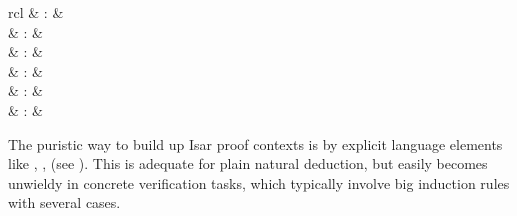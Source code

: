 \begin{isabellebody}
\begin{isamarkuptext}
\begin{description}
  \end{description}%
\end{isamarkuptext}%
\isamarkuptrue%
%
\isamarkuptrue%
%
\isamarkuptrue%
%
\begin{isamarkuptext}%
\begin{matharray}{rcl}
    \hypertarget{command.case}{\hyperlink{command.case}{\mbox{}}} & : &  \\
    \hypertarget{command.print-cases}{\hyperlink{command.print-cases}{\mbox{}}} & : &  \\
    \hypertarget{attribute.case-names}{\hyperlink{attribute.case-names}{\mbox{}}} & : &  \\
    \hypertarget{attribute.case-conclusion}{\hyperlink{attribute.case-conclusion}{\mbox{}}} & : &  \\
    \hypertarget{attribute.params}{\hyperlink{attribute.params}{\mbox{}}} & : &  \\
    \hypertarget{attribute.consumes}{\hyperlink{attribute.consumes}{\mbox{}}} & : &  \\
  \end{matharray}

  The puristic way to build up Isar proof contexts is by explicit
  language elements like \hyperlink{command.fix}{\mbox{}}, \hyperlink{command.assume}{\mbox{}},
  \hyperlink{command.let}{\mbox{}} (see ).  This is adequate
  for plain natural deduction, but easily becomes unwieldy in concrete
  verification tasks, which typically involve big induction rules with
  several cases.


\end{isamarkuptext}
\end{isabellebody}
